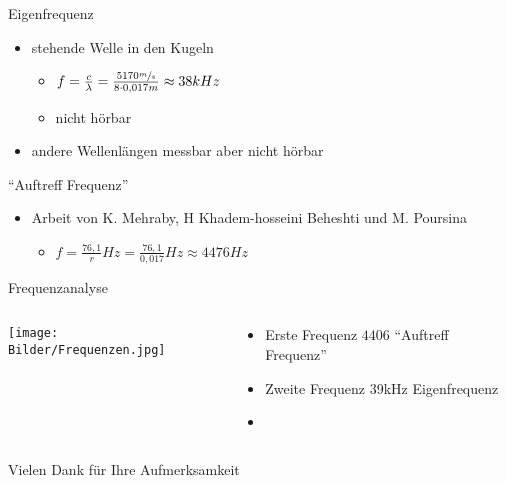 \documentclass[12pt]{beamer}
\begin{document}
\begin{frame}{Eigenfrequenz}
\begin{itemize}
\item<1-> stehende Welle in den Kugeln
	\begin{itemize}
	\item<2->[$\rightarrow$] $f=\frac{c}{\lambda}=\frac{5170\sfrac{m}{s}}{8\cdot 0,017m}\approx 38kHz$
	\item<3->[$\rightarrow$] nicht hörbar
	\end{itemize}
\item<4-> andere Wellenlängen messbar aber nicht hörbar
\end{itemize}
\end{frame}

\begin{frame}{"`Auftreff Frequenz"'}
\begin{itemize}
\item<1-> Arbeit von K. Mehraby, H Khadem-hosseini Beheshti und M. Poursina
	\begin{itemize}
	\item<2->[$\rightarrow$] $f=\frac{76,1}{r}Hz=\frac{76,1}{0,017}Hz\approx 4476Hz$
	\end{itemize}
\end{itemize}
\end{frame}

\begin{frame}{Frequenzanalyse}
\begin{columns}
\begin{column}{.6\textwidth}
\texttt{[image: Bilder/Frequenzen.jpg]}
\end{column}
\begin{column}{.4\textwidth}
\begin{itemize}
\item<2-> Erste Frequenz $4406$ "`Auftreff Frequenz"'
\item<3-> Zweite Frequenz 39kHz Eigenfrequenz
\item[ ] \ 
\end{itemize}
\end{column}
\end{columns}
\end{frame}

\begin{frame}
\center
{\HUGE Vielen Dank für Ihre Aufmerksamkeit}
\end{frame}
\end{document}
